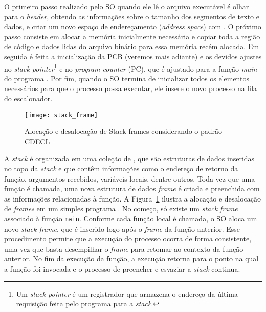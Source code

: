O primeiro passo realizado pelo SO quando ele lê o arquivo executável é olhar
para o \emph{header}, obtendo as informações sobre o tamanho dos segmentos de
texto e dados, e criar
um novo espaço de endereçamento (\emph{address space}) com . O próximo passo consiste em alocar a memória inicialmente necessária
e copiar toda a região de código e dados lidas do arquivo binário para essa
memória recém alocada. Em seguida é feita a inicialização da PCB (veremos
mais adiante) e os devidos ajustes no \emph{stack pointer}\footnote{Um
\emph{stack pointer} é um registrador que armazena o endereço da última
requisição feita pelo programa para a \emph{stack}.} e no \emph{program
counter} (PC), que é ajustado para a função \emph{main} do programa
\citep{patterson}. Por fim, quando o SO termina de inicializar todos os
elementos necessários para que o processo possa executar, ele insere o novo
processo na fila do escalonador.

\begin{figure}[!h]
  \centering
  \texttt{[image: stack\_frame]}
  \caption{Alocação e desalocação de Stack frames considerando o padrão CDECL~\citep{patterson}}
  \label{fig:stack_frames} 
\end{figure}


A \emph{stack} é organizada em uma coleção de , que
são estruturas de dados inseridas no topo da \emph{stack} e que contêm
informações como o endereço de retorno da função, argumentos recebidos,
variáveis locais, dentre outros. Toda vez que uma função é chamada, uma nova
estrutura de dados \emph{frame} é criada e preenchida com as informações
relacionadas à função.  A Figura~\ref{fig:stack_frames} ilustra a alocação e
desalocação de \textit{frames} em um simples programa \citep{gdb}. No começo,
só existe um \emph{stack frame} associado à função \texttt{main}. Conforme cada
função local é chamada, o SO aloca um novo \emph{stack frame}, que é inserido
logo após o \emph{frame} da função anterior. Esse procedimento permite que a
execução do processo ocorra de forma consistente, uma vez que basta desempilhar
o \emph{frame} para retomar ao contexto da função anterior. No fim da execução
da função, a execução retorna para o ponto na qual a função foi invocada e o
processo de preencher e esvaziar a \emph{stack} continua.

